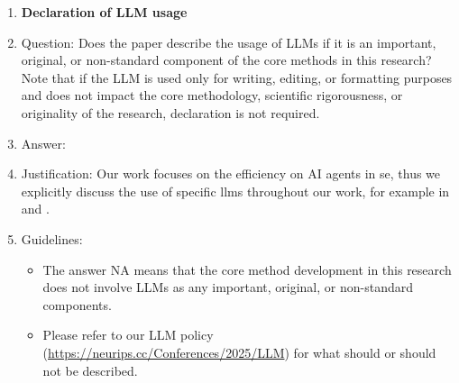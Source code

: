 \documentclass{article}
\begin{document}
\begin{enumerate}
\item {\bf Declaration of LLM usage}
    \item[] Question: Does the paper describe the usage of LLMs if it is an important, original, or non-standard component of the core methods in this research? Note that if the LLM is used only for writing, editing, or formatting purposes and does not impact the core methodology, scientific rigorousness, or originality of the research, declaration is not required.
    \item[] Answer: \answerYes{} %
    \item[] Justification: Our work focuses on the efficiency on AI agents in \ac{se}, thus we explicitly discuss the use of specific \acp{llm} throughout our work, for example in  and .
    \item[] Guidelines:
    \begin{itemize}
        \item The answer NA means that the core method development in this research does not involve LLMs as any important, original, or non-standard components.
        \item Please refer to our LLM policy (\url{https://neurips.cc/Conferences/2025/LLM}) for what should or should not be described.
    \end{itemize}

\end{enumerate}
\end{document}
